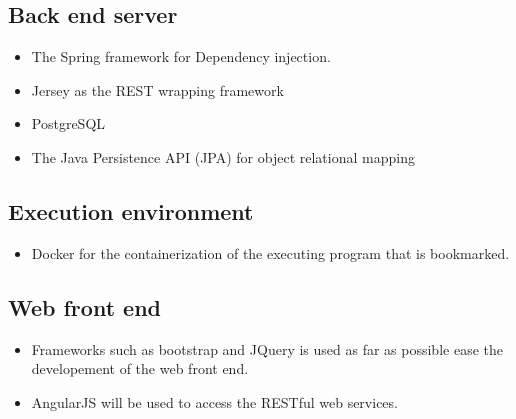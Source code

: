 \subsection{Back end server}
\begin{itemize}
\item The Spring framework for Dependency injection.
\item Jersey as the REST wrapping framework
\item PostgreSQL
\item The Java Persistence API (JPA) for object relational mapping
\end{itemize}

\subsection{Execution environment}
\begin{itemize}
\item Docker for the containerization of the executing program that is bookmarked.
\end{itemize}

\subsection{Web front end}
\begin{itemize}
\item Frameworks such as bootstrap and JQuery is used as far as possible ease the
developement of the web front end.
\item AngularJS will be used to access the RESTful web services.
\end{itemize}
